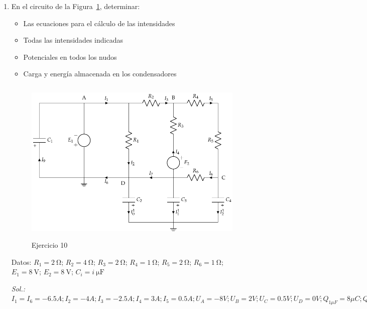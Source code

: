 \begin{enumerate}
\item En el circuito de la Figura~\ref{fig.ej11_BT1}, determinar:
  \begin{itemize}
  \item Las ecuaciones para el cálculo de las intensidades
  \item Todas las intensidades indicadas
  \item Potenciales en todos los nudos
  \item Carga y energía almacenada en los condensadores
  \end{itemize}
  \begin{figure}[H]
    \centering \includegraphics[height=8cm]{../figs/ej11_BT1.pdf}
    \caption{Ejercicio 10}
    \label{fig.ej11_BT1}
  \end{figure}

  Datos: $R_1 = \qty{2}{\ohm}$; $R_2 = \qty{4}{\ohm}$; $R_3 = \qty{2}{\ohm}$; $R_4 = \qty{1}{\ohm}$; $R_5 = \qty{2}{\ohm}$; $R_6 = \qty{1}{\ohm}$; $E_1 = \qty{8}{\volt}$; $E_2 = \qty{8}{\volt}$; $C_i = \qty[parse-numbers=false]{i}{\micro\farad}$

  \emph{Sol.:
    $I_1=I_6=-6.5A; I_2=-4A; I_3=-2.5A; I_4=3A; I_5=0.5A; U_A=-8V;
    U_B=2V; U_C=0.5V; U_D=0V;Q_{1\mu F}=8\mu C; Q_{2\mu F}=Q_{3\mu
      F}=0\mu C; Q_{4\mu F}=-2\mu C; E_{1\mu F}=32\mu F; E_{2\mu
      F}=E_{3\mu F}=0 J; E_{4\mu F}=0.5\mu C$}


\end{enumerate}
